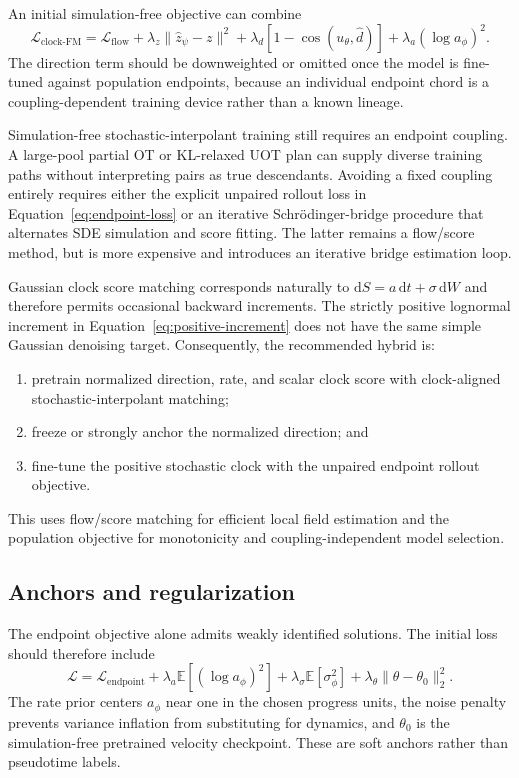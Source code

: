 \documentclass[11pt]{article}
\newcommand{\E}{\mathbb{E}}
\newcommand{\dd}{\mathrm{d}}
\begin{document}
An initial simulation-free objective can combine
\begin{equation}
  \mathcal L_{\mathrm{clock\mbox{-}FM}}
  =\mathcal L_{\mathrm{flow}}
   +\lambda_z\lVert\widehat z_\psi-z\rVert^2
   +\lambda_d\left[1-\cos(u_\theta,\widehat d)\right]
   +\lambda_a(\log a_\phi)^2.
  \label{eq:clock-fm-loss}
\end{equation}
The direction term should be downweighted or omitted once the model is
fine-tuned against population endpoints, because an individual endpoint chord
is a coupling-dependent training device rather than a known lineage.

Simulation-free stochastic-interpolant training still requires an endpoint
coupling. A large-pool partial OT or KL-relaxed UOT plan can supply diverse
training paths without interpreting pairs as true descendants. Avoiding a
fixed coupling entirely requires either the explicit unpaired rollout loss in
Equation~\ref{eq:endpoint-loss} or an iterative Schr\"odinger-bridge procedure
that alternates SDE simulation and score fitting. The latter remains a
flow/score method, but is more expensive and introduces an iterative bridge
estimation loop.

Gaussian clock score matching corresponds naturally to
$\dd S=a\,\dd t+\sigma\,\dd W$ and therefore permits occasional backward
increments. The strictly positive lognormal increment in
Equation~\ref{eq:positive-increment} does not have the same simple Gaussian
denoising target. Consequently, the recommended hybrid is:
\begin{enumerate}
  \item pretrain normalized direction, rate, and scalar clock score with
        clock-aligned stochastic-interpolant matching;
  \item freeze or strongly anchor the normalized direction; and
  \item fine-tune the positive stochastic clock with the unpaired endpoint
        rollout objective.
\end{enumerate}
This uses flow/score matching for efficient local field estimation and the
population objective for monotonicity and coupling-independent model
selection.

\subsection{Anchors and regularization}

The endpoint objective alone admits weakly identified solutions. The initial
loss should therefore include
\begin{equation}
  \mathcal L
  =\mathcal L_{\mathrm{endpoint}}
   +\lambda_a\E[(\log a_\phi)^2]
   +\lambda_\sigma\E[\sigma_\phi^2]
   +\lambda_\theta\lVert\theta-\theta_0\rVert_2^2.
  \label{eq:regularized-loss}
\end{equation}
The rate prior centers $a_\phi$ near one in the chosen progress units, the
noise penalty prevents variance inflation from substituting for dynamics, and
$\theta_0$ is the simulation-free pretrained velocity checkpoint. These are
soft anchors rather than pseudotime labels.
\end{document}
